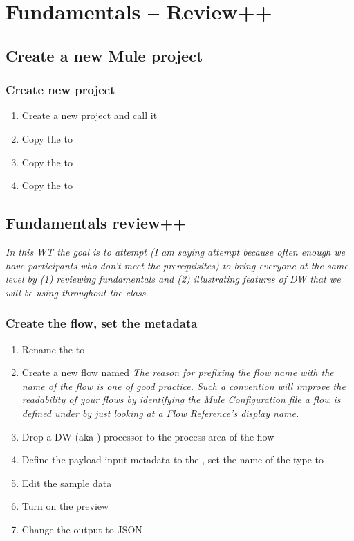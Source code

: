 \chapter{Fundamentals -- Review++}
\section{Create a new Mule project}
\subsection{Create new project}
\begin{enumerate}
\item Create a new project and call it 
\item Copy the  to 
\item Copy the  to 
\item Copy the  to 
\end{enumerate}

\section{Fundamentals review++}
\emph{
  In this WT the goal is to attempt (I am saying attempt because often enough we have participants who don’t meet the prerequisites) to bring everyone at the same level by (1) reviewing fundamentals and (2) illustrating features of DW that we will be using throughout the class.
}

\subsection{Create the flow, set the metadata}
\begin{enumerate}
\item Rename the  to 
\item Create a new flow named 
  \newline
  \emph{
    The reason for prefixing the flow name with the name of the flow is one of good practice.
    Such a convention will improve the readability of your flows by identifying the
    Mule Configuration file a flow is defined under by just looking at a Flow Reference's
    display name.
  }
\item Drop a DW (aka ) processor to the process area of the flow
\item Define the payload input metadata to the ,
  set the name of the type to 
\item Edit the sample data
\item Turn on the preview
\item Change the output to JSON
\end{enumerate}


